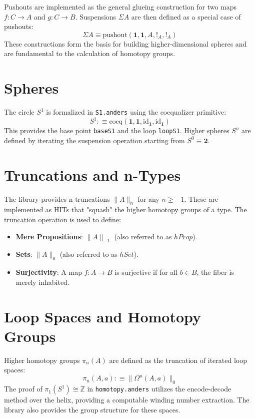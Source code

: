 \documentclass[11pt]{article}
\begin{document}
Pushouts are implemented as the general glueing construction for two maps $f : C \to A$ and $g : C \to B$. Suspensions $\Sigma A$ are then defined as a special case of pushouts:
\begin{equation}
    \Sigma A \equiv \text{pushout}(\mathbf{1}, \mathbf{1}, A, !_A, !_A)
\end{equation}
These constructions form the basis for building higher-dimensional spheres and are fundamental to the calculation of homotopy groups.

\section{Spheres}

The circle $S^1$ is formalized in \texttt{S1.anders} using the coequalizer primitive:
\begin{equation}
    S^1 :\equiv \text{coeq}(\mathbf{1}, \mathbf{1}, \text{id}_{\mathbf{1}}, \text{id}_{\mathbf{1}})
\end{equation}
This provides the base point \texttt{baseS1} and the loop \texttt{loopS1}. Higher spheres $S^n$ are defined by iterating the suspension operation starting from $S^0 \equiv \mathbf{2}$.

\section{Truncations and n-Types}

The library provides n-truncations $\| A \|_n$ for any $n \ge -1$. These are implemented as HITs that "squash" the higher homotopy groups of a type. The truncation operation is used to define:
\begin{itemize}
    \item \textbf{Mere Propositions}: $\| A \|_{-1}$ (also referred to as $hProp$).
    \item \textbf{Sets}: $\| A \|_0$ (also referred to as $hSet$).
    \item \textbf{Surjectivity}: A map $f : A \to B$ is surjective if for all $b \in B$, the fiber is merely inhabited.
\end{itemize}

\section{Loop Spaces and Homotopy Groups}

Higher homotopy groups $\pi_n(A)$ are defined as the truncation of iterated loop spaces:
\begin{equation}
    \pi_n(A, a) :\equiv \| \Omega^n(A, a) \|_0
\end{equation}
The proof of $\pi_1(S^1) \cong \mathbb{Z}$ in \texttt{homotopy.anders} utilizes the encode-decode method over the helix, providing a computable winding number extraction. The library also provides the group structure for these spaces.
\end{document}
